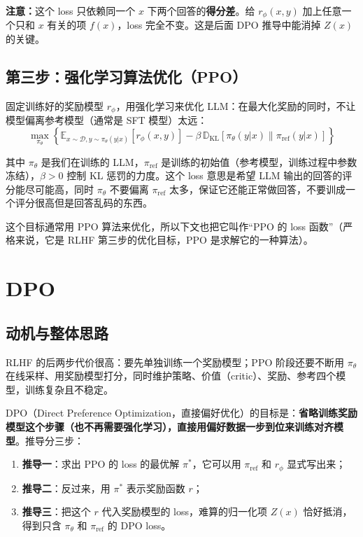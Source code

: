 \documentclass[UTF8,fontset=fandol]{ctexart}
\begin{document}
\textbf{注意：}这个 loss 只依赖同一个 \(x\) 下两个回答的\textbf{得分差}。给 \(r_\phi(x, y)\) 加上任意一个只和 \(x\) 有关的项 \(f(x)\)，loss 完全不变。这是后面 DPO 推导中能消掉 \(Z(x)\) 的关键。

\subsection{第三步：强化学习算法优化（PPO）}

固定训练好的奖励模型 \(r_\phi\)，用强化学习来优化 LLM：在最大化奖励的同时，不让模型偏离参考模型（通常是 SFT 模型）太远：
\[
\max_{\pi_\theta} \left\{ \mathbb{E}_{x \sim \mathcal{D}, y \sim \pi_\theta(y|x)} \left[ r_\phi(x, y) \right] - \beta\, \mathbb{D}_{\mathrm{KL}} \left[ \pi_\theta(y|x) \parallel \pi_{\text{ref}}(y|x) \right] \right\}
\]

其中 \(\pi_\theta\) 是我们在训练的 LLM，\(\pi_{\text{ref}}\) 是训练的初始值（参考模型，训练过程中参数冻结），\(\beta > 0\) 控制 KL 惩罚的力度。这个 loss 意思是希望 LLM 输出的回答的评分能尽可能高，同时 \(\pi_\theta\) 不要偏离 \(\pi_{\text{ref}}\) 太多，保证它还能正常做回答，不要训成一个评分很高但是回答乱码的东西。

这个目标通常用 PPO 算法来优化，所以下文也把它叫作“PPO 的 loss 函数”（严格来说，它是 RLHF 第三步的优化目标，PPO 是求解它的一种算法）。

\section{DPO}

\subsection{动机与整体思路}

RLHF 的后两步代价很高：要先单独训练一个奖励模型；PPO 阶段还要不断用 \(\pi_\theta\) 在线采样、用奖励模型打分，同时维护策略、价值（critic）、奖励、参考四个模型，训练复杂且不稳定。

DPO（Direct Preference Optimization，直接偏好优化）的目标是：\textbf{省略训练奖励模型这个步骤（也不再需要强化学习），直接用偏好数据一步到位来训练对齐模型}。推导分三步：
\begin{enumerate}
  \item \textbf{推导一}：求出 PPO 的 loss 的最优解 \(\pi^*\)，它可以用 \(\pi_{\text{ref}}\) 和 \(r_\phi\) 显式写出来；
  \item \textbf{推导二}：反过来，用 \(\pi^*\) 表示奖励函数 \(r\)；
  \item \textbf{推导三}：把这个 \(r\) 代入奖励模型的 loss，难算的归一化项 \(Z(x)\) 恰好抵消，得到只含 \(\pi_\theta\) 和 \(\pi_{\text{ref}}\) 的 DPO loss。
\end{enumerate}
\end{document}
